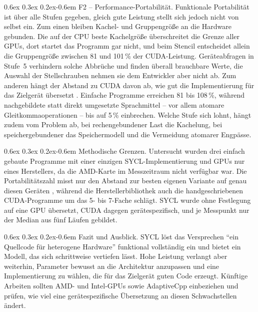 \documentclass[12pt,a4paper]{article}
\makeatletter
\renewcommand\paragraph{\@startsection{paragraph}{4}{\z@}%
    {0.6ex \@plus 0.3ex \@minus 0.2ex}{-0.6em}%
    {\normalfont\normalsize\bfseries}}
\makeatother
\begin{document}
\paragraph{F2 -- Performance-Portabilität.}
Funktionale Portabilität ist über alle Stufen gegeben, gleich gute Leistung
stellt sich jedoch nicht von selbst ein. Zum einen bleiben Kachel- und
Gruppengröße an die Hardware gebunden. Die auf der CPU beste Kachelgröße
überschreitet die Grenze aller GPUs, dort startet das Programm gar nicht, und
beim Stencil entscheidet allein die Gruppengröße zwischen 81 und 101\,\% der
CUDA-Leistung. Geräteabfragen in Stufe~5 verhindern solche Abbrüche und finden
überall brauchbare Werte, die Auswahl der Stellschrauben nehmen sie dem
Entwickler aber nicht ab. Zum anderen hängt der Abstand zu CUDA davon ab, wie gut
die Implementierung für das Zielgerät übersetzt \cite{deakin2020sycl}. Einfache
Programme erreichen 81 bis 108\,\%, während nachgebildete statt direkt
umgesetzte Sprachmittel -- vor allem atomare Gleitkommaoperationen -- bis auf
5\,\% einbrechen. Welche Stufe sich lohnt, hängt zudem vom Problem ab, bei
rechengebundener Last die Kachelung, bei speichergebundener das Speichermodell
und die Vermeidung atomarer Engpässe.

\paragraph{Methodische Grenzen.}
Untersucht wurden drei einfach gebaute Programme mit einer einzigen
SYCL-Implementierung und GPUs nur eines Herstellers, da die AMD-Karte im
Messzeitraum nicht verfügbar war. Die Portabilitätszahl misst nur den Abstand zur
besten eigenen Variante auf genau diesen Geräten
\cite{pennycook2019implications}, während die Herstellerbibliothek auch die
handgeschriebenen CUDA-Programme um das 5- bis 7-Fache schlägt. SYCL wurde ohne
Festlegung auf eine GPU übersetzt, CUDA dagegen gerätespezifisch, und je
Messpunkt nur der Median aus fünf Läufen gebildet.

\paragraph{Fazit und Ausblick.}
SYCL löst das Versprechen \enquote{ein Quellcode für heterogene Hardware}
funktional vollständig ein und bietet ein Modell, das sich schrittweise
vertiefen lässt. Hohe Leistung verlangt aber weiterhin, Parameter bewusst an die
Architektur anzupassen und eine Implementierung zu wählen, die für das Zielgerät
guten Code erzeugt. Künftige Arbeiten sollten AMD- und Intel-GPUs sowie
AdaptiveCpp einbeziehen und prüfen, wie viel eine gerätespezifische Übersetzung
an diesen Schwachstellen ändert.
\end{document}
